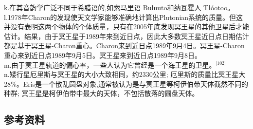 k.在其音韵学广泛不同于希腊语的,如索马里语 Buluuto和纳瓦霍人 Tłóotoo。\\
l.1978年Charon的发现使天文学家能够准确地计算出Plutonian系统的质量。但这并没有表明这两个物体的个体质量，只有在2005年底发现冥王星的其他卫星后才能估计。结果，由于冥王星于1989年来到近日点，因此大多数冥王星近日点日期估计都是基于冥王星-Charon重心。Charon来到近日点1989年9月4日。冥王星-Charon重心来到近日点1989年9月5日。冥王星来到近日点1989年9月8日。\\
m.由于冥王星轨道的偏心率，一些人认为它曾经是一个海王星的卫星。\(^\text{[102]}\)\\
n.矮行星厄里斯与冥王星的大小大致相同，约2330公里; 厄里斯的质量比冥王星大28\%。Eris是一个散乱圆盘对象,通常被认为是与冥王星等柯伊伯带天体截然不同的种群; 冥王星是柯伊伯带中最大的天体，不包括散落的圆盘天体。
\subsection{参考资料}

